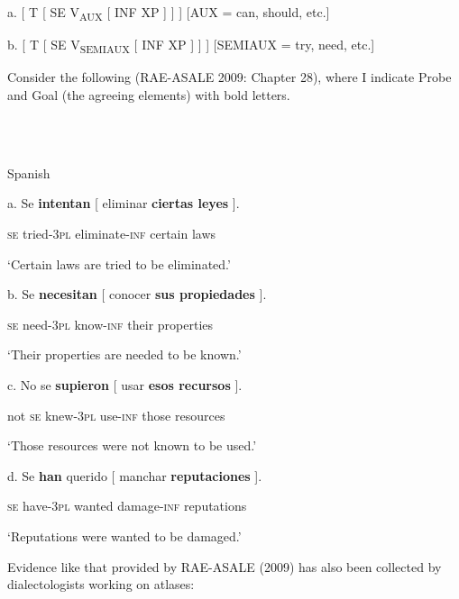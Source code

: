 \documentclass[output=paper]{langsci/langscibook}
\begin{document}
\ea%
    \label{ex:key:8}
    \gll\\
        \\
    \glt
    \z

          a. [ T [ SE  V\textsubscript{AUX}         [ INF XP ] ] ]      [AUX = can, should, etc.]

  b. [ T [ SE  V\textsubscript{SEMIAUX}  [ INF XP ] ] ]     [SEMIAUX = try, need, etc.]

Consider the following (RAE-ASALE 2009: Chapter 28), where I indicate Probe and Goal (the agreeing elements) with bold letters.

\ea%
    \label{ex:key:9}
    \gll\\
        \\
    \glt
    \z

           Spanish

a.   Se  \textbf{intentan}  [ eliminar        \textbf{ciertas  leyes} ].        

                  \textsc{se} tried\textsc{{}-3pl}  eliminate-\textsc{inf}  certain   laws

                  ‘Certain laws are tried to be eliminated.’  

  b.   Se  \textbf{necesitan}  [ conocer     \textbf{sus    propiedades} ].         

                  \textsc{se}  need\textsc{{}-3pl}   know-\textsc{inf}   their  properties

                  ‘Their properties are needed to be known.’

   c.   No se   \textbf{supieron}  [ usar        \textbf{esos    recursos} ].        

                  not \textsc{se} knew\textsc{{}-3pl}    use-\textsc{inf}   those   resources

               ‘Those resources were not known to be used.’

  d.   Se   \textbf{han}           querido [ manchar        \textbf{reputaciones} ].     

                   \textsc{se} have\textsc{{}-3pl}  wanted    damage-\textsc{inf}   reputations

                   ‘Reputations were wanted to be damaged.’   

Evidence like that provided by RAE-ASALE (2009) has also been collected by dialectologists working on atlases:
\end{document}
